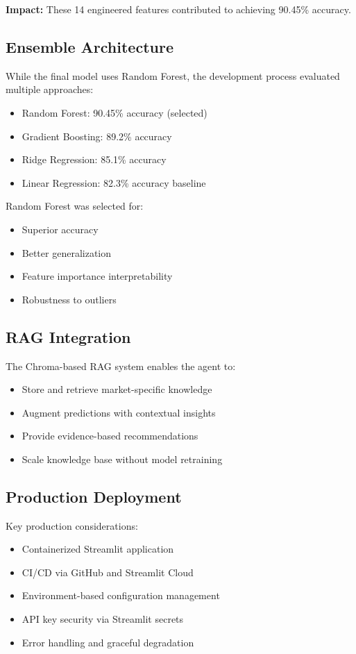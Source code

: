 \documentclass[11pt,a4paper]{article}
\begin{document}
\textbf{Impact:} These 14 engineered features contributed to achieving 90.45\% accuracy.

\subsection{Ensemble Architecture}

While the final model uses Random Forest, the development process evaluated multiple approaches:

\begin{itemize}
    \item Random Forest: 90.45\% accuracy (selected)
    \item Gradient Boosting: 89.2\% accuracy
    \item Ridge Regression: 85.1\% accuracy
    \item Linear Regression: 82.3\% accuracy baseline
\end{itemize}

Random Forest was selected for:
\begin{itemize}
    \item Superior accuracy
    \item Better generalization
    \item Feature importance interpretability
    \item Robustness to outliers
\end{itemize}

\subsection{RAG Integration}

The Chroma-based RAG system enables the agent to:
\begin{itemize}
    \item Store and retrieve market-specific knowledge
    \item Augment predictions with contextual insights
    \item Provide evidence-based recommendations
    \item Scale knowledge base without model retraining
\end{itemize}

\subsection{Production Deployment}

Key production considerations:
\begin{itemize}
    \item Containerized Streamlit application
    \item CI/CD via GitHub and Streamlit Cloud
    \item Environment-based configuration management
    \item API key security via Streamlit secrets
    \item Error handling and graceful degradation
\end{itemize}
\end{document}
